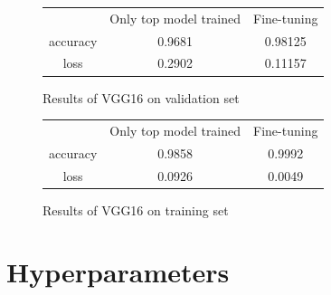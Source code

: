 \documentclass[a4paper,12pt]{article}
\begin{document}
    \begin{figure}[!h]
        \centering
        \begin{tabular}{ccc}
            & Only top model trained & Fine-tuning \\
            accuracy & 0.9681 & 0.98125 \\
            loss & 0.2902 & 0.11157 \\
        \end{tabular}
        \caption{Results of VGG16 on validation set}
        \label{fig:results_ft_val}
    \end{figure}
    \begin{figure}[!h]
        \centering
        \begin{tabular}{ccc}
            & Only top model trained & Fine-tuning \\
            accuracy & 0.9858 & 0.9992 \\
            loss & 0.0926 & 0.0049 \\
        \end{tabular}
        \caption{Results of VGG16 on training set}
        \label{fig:results_ft_train}
    \end{figure}

    \section{Hyperparameters}
\end{document}
